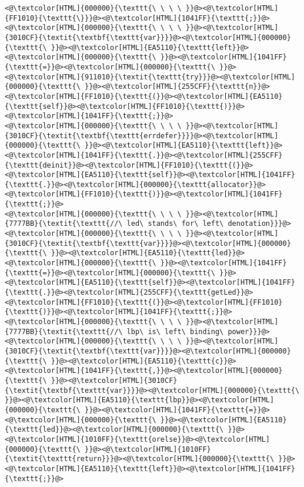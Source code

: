 \begin{lstlisting}
<@\textcolor[HTML]{000000}{\texttt{\ \ \ \ }}@><@\textcolor[HTML]{FF1010}{\texttt{\}}}@><@\textcolor[HTML]{1041FF}{\texttt{;}}@>
<@\textcolor[HTML]{000000}{\texttt{\ \ \ \ }}@><@\textcolor[HTML]{3010CF}{\textit{\textbf{\texttt{var}}}}@><@\textcolor[HTML]{000000}{\texttt{\ }}@><@\textcolor[HTML]{EA5110}{\texttt{left}}@><@\textcolor[HTML]{000000}{\texttt{\ }}@><@\textcolor[HTML]{1041FF}{\texttt{=}}@><@\textcolor[HTML]{000000}{\texttt{\ }}@><@\textcolor[HTML]{911010}{\textit{\texttt{try}}}@><@\textcolor[HTML]{000000}{\texttt{\ }}@><@\textcolor[HTML]{255CFF}{\texttt{n}}@><@\textcolor[HTML]{FF1010}{\texttt{(}}@><@\textcolor[HTML]{EA5110}{\texttt{self}}@><@\textcolor[HTML]{FF1010}{\texttt{)}}@><@\textcolor[HTML]{1041FF}{\texttt{;}}@>
<@\textcolor[HTML]{000000}{\texttt{\ \ \ \ }}@><@\textcolor[HTML]{3010CF}{\textit{\textbf{\texttt{errdefer}}}}@><@\textcolor[HTML]{000000}{\texttt{\ }}@><@\textcolor[HTML]{EA5110}{\texttt{left}}@><@\textcolor[HTML]{1041FF}{\texttt{.}}@><@\textcolor[HTML]{255CFF}{\texttt{deinit}}@><@\textcolor[HTML]{FF1010}{\texttt{(}}@><@\textcolor[HTML]{EA5110}{\texttt{self}}@><@\textcolor[HTML]{1041FF}{\texttt{.}}@><@\textcolor[HTML]{000000}{\texttt{allocator}}@><@\textcolor[HTML]{FF1010}{\texttt{)}}@><@\textcolor[HTML]{1041FF}{\texttt{;}}@>
<@\textcolor[HTML]{000000}{\texttt{\ \ \ \ }}@><@\textcolor[HTML]{7777BB}{\textit{\texttt{//\ led\ stands\ for\ left\ denotation}}}@>
<@\textcolor[HTML]{000000}{\texttt{\ \ \ \ }}@><@\textcolor[HTML]{3010CF}{\textit{\textbf{\texttt{var}}}}@><@\textcolor[HTML]{000000}{\texttt{\ }}@><@\textcolor[HTML]{EA5110}{\texttt{led}}@><@\textcolor[HTML]{000000}{\texttt{\ }}@><@\textcolor[HTML]{1041FF}{\texttt{=}}@><@\textcolor[HTML]{000000}{\texttt{\ }}@><@\textcolor[HTML]{EA5110}{\texttt{self}}@><@\textcolor[HTML]{1041FF}{\texttt{.}}@><@\textcolor[HTML]{255CFF}{\texttt{getLed}}@><@\textcolor[HTML]{FF1010}{\texttt{(}}@><@\textcolor[HTML]{FF1010}{\texttt{)}}@><@\textcolor[HTML]{1041FF}{\texttt{;}}@>
<@\textcolor[HTML]{000000}{\texttt{\ \ \ \ }}@><@\textcolor[HTML]{7777BB}{\textit{\texttt{//\ lbp\ is\ left\ binding\ power}}}@>
<@\textcolor[HTML]{000000}{\texttt{\ \ \ \ }}@><@\textcolor[HTML]{3010CF}{\textit{\textbf{\texttt{var}}}}@><@\textcolor[HTML]{000000}{\texttt{\ }}@><@\textcolor[HTML]{EA5110}{\texttt{c}}@><@\textcolor[HTML]{1041FF}{\texttt{,}}@><@\textcolor[HTML]{000000}{\texttt{\ }}@><@\textcolor[HTML]{3010CF}{\textit{\textbf{\texttt{var}}}}@><@\textcolor[HTML]{000000}{\texttt{\ }}@><@\textcolor[HTML]{EA5110}{\texttt{lbp}}@><@\textcolor[HTML]{000000}{\texttt{\ }}@><@\textcolor[HTML]{1041FF}{\texttt{=}}@><@\textcolor[HTML]{000000}{\texttt{\ }}@><@\textcolor[HTML]{EA5110}{\texttt{led}}@><@\textcolor[HTML]{000000}{\texttt{\ }}@><@\textcolor[HTML]{1010FF}{\texttt{orelse}}@><@\textcolor[HTML]{000000}{\texttt{\ }}@><@\textcolor[HTML]{1010FF}{\textit{\texttt{return}}}@><@\textcolor[HTML]{000000}{\texttt{\ }}@><@\textcolor[HTML]{EA5110}{\texttt{left}}@><@\textcolor[HTML]{1041FF}{\texttt{;}}@>

\end{lstlisting}
